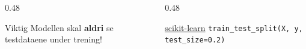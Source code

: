 \documentclass[aspectratio=169, 10pt]{beamer}
\begin{document}
\begin{frame}
    \vspace{2mm}
    \begin{columns}[T]
        \begin{column}{0.48\textwidth}
            \begin{alertblock}{\footnotesize Viktig}
                \footnotesize Modellen skal \textbf{aldri} se testdataene under trening!
            \end{alertblock}
        \end{column}
        \begin{column}{0.48\textwidth}
            \begin{block}{\footnotesize \href{https://scikit-learn.org/stable/modules/generated/sklearn.model_selection.train_test_split.html}{scikit-learn}}
                \footnotesize \texttt{train\_test\_split(X, y, test\_size=0.2)}
            \end{block}
        \end{column}
    \end{columns}

\end{frame}
\end{document}
